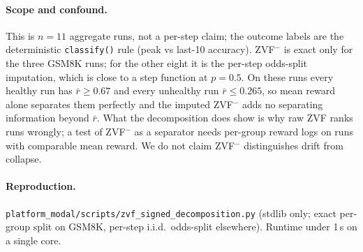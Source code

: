 \paragraph{Scope and confound.}
This is $n{=}11$ aggregate runs, not a per-step claim; the outcome labels are the
deterministic \texttt{classify()} rule (peak vs last-10 accuracy). ZVF$^-$ is
exact only for the three GSM8K runs; for the other eight it is the per-step
odds-split imputation, which is close to a step function at $p=0.5$. On these runs
every healthy run has $\bar r\ge0.67$ and every unhealthy run $\bar r\le0.265$, so
mean reward alone separates them perfectly and the imputed ZVF$^-$ adds no
separating information beyond $\bar r$. What the decomposition does show is why
raw ZVF ranks runs wrongly; a test of ZVF$^-$ as a separator needs per-group
reward logs on runs with comparable mean reward. We do not claim ZVF$^-$
distinguishes drift from collapse.

\paragraph{Reproduction.}
\texttt{platform\_modal/scripts/zvf\_signed\_decomposition.py} (stdlib only; exact
per-group split on GSM8K, per-step i.i.d.\ odds-split elsewhere). Runtime under
1\,s on a single core.
